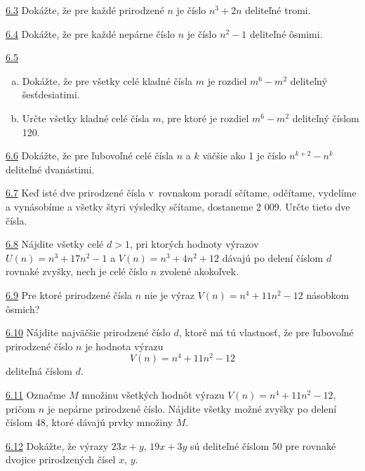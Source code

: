 \noindent \ul{6.3}  Dokážte, že pre každé prirodzené $n$ je číslo $n^3+ 2n$ deliteľné tromi.




\noindent \ul{6.4}  Dokážte, že pre každé nepárne číslo $n$ je číslo $n^2 - 1$ deliteľné ôsmimi.




\noindent \ul{6.5}  \begin{enumerate}[a)]
\item Dokážte, že pre všetky celé kladné čísla $m$ je rozdiel $m^6 - m^2$ deliteľný šesťdesiatimi.
\item Určte všetky kladné celé čísla $m$, pre ktoré je rozdiel $m^6 - m^2$ deliteľný číslom 120.
\end{enumerate}



\noindent \ul{6.6} 
Dokážte, že pre ľubovoľné celé čísla $n$ a $k$ väčšie ako 1 je číslo $n^{k+2} - n^k$ deliteľné dvanástimi.




\noindent \ul{6.7} 
Keď isté dve prirodzené čísla v~rovnakom poradí sčítame, odčítame, vydelíme a vynásobíme a všetky štyri výsledky sčítame, dostaneme 2 009. Určte tieto dve čísla.




\noindent \ul{6.8}  Nájdite všetky celé $d > 1$, pri ktorých hodnoty výrazov $U(n) = n^3+ 17n^2-1$ a $V (n) = n^3+ 4n^2+ 12$ dávajú po delení číslom $d$ rovnaké zvyšky, nech je celé číslo $n$ zvolené akokoľvek.




\noindent \ul{6.9}  Pre ktoré prirodzené čísla $n$ nie je výraz $V (n) = n^4+ 11n^2 - 12$ násobkom ôsmich?




\noindent \ul{6.10} 
Nájdite najväčšie prirodzené číslo $d$, ktoré má tú vlastnosť, že pre ľubovoľné prirodzené číslo $n$ je hodnota výrazu $$V (n) = n^4+ 11n^2-12$$
deliteľná číslom $d$.




\noindent \ul{6.11} 
Označme $M$ množinu všetkých hodnôt výrazu $V (n) = n^4 + 11n^2 - 12$, pričom $n$ je nepárne prirodzené číslo. Nájdite všetky možné zvyšky po delení číslom 48, ktoré dávajú prvky množiny $M$.




\noindent \ul{6.12} 
Dokážte, že výrazy $23x + y$, $19x + 3y$ sú deliteľné číslom 50 pre rovnaké dvojice prirodzených čísel $x$, $y$.




